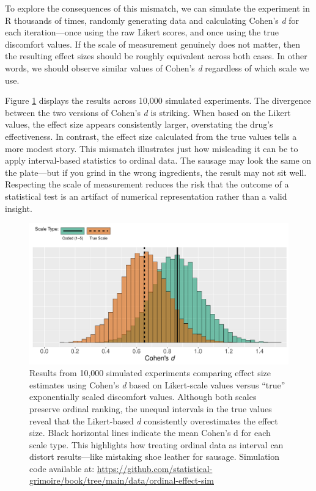 To explore the consequences of this mismatch, we can simulate the experiment in R thousands of times, randomly generating data and calculating Cohen’s \textit{d} for each iteration—once using the raw Likert scores, and once using the true discomfort values. If the scale of measurement genuinely does not matter, then the resulting effect sizes should be roughly equivalent across both cases. In other words, we should observe similar values of Cohen’s \textit{d} regardless of which scale we use.

Figure \ref{fig:ord_vs_int_effect} displays the results across 10,000 simulated experiments. The divergence between the two versions of Cohen’s \textit{d} is striking. When based on the Likert values, the effect size appears consistently larger, overstating the drug’s effectiveness. In contrast, the effect size calculated from the true values tells a more modest story. This mismatch illustrates just how misleading it can be to apply interval-based statistics to ordinal data. The sausage may look the same on the plate—but if you grind in the wrong ingredients, the result may not sit well. Respecting the scale of measurement reduces the risk that the outcome of a statistical test is an artifact of numerical representation rather than a valid insight.

\vspace{2em}

\begin{figure}[h]
\includegraphics[width = \textwidth]{data/ordinal-effect-sim/ord_vs_int_effect.pdf}
\caption{Results from 10,000 simulated experiments comparing effect size estimates using Cohen’s \textit{d} based on Likert-scale values versus ``true'' exponentially scaled discomfort values. Although both scales preserve ordinal ranking, the unequal intervals in the true values reveal that the Likert-based \textit{d} consistently overestimates the effect size. Black horizontal lines indicate the mean Cohen’s d for each scale type. This highlights how treating ordinal data as interval can distort results—like mistaking shoe leather for sausage.
Simulation code available at: \url{https://github.com/statistical-grimoire/book/tree/main/data/ordinal-effect-sim}}
\label{fig:ord_vs_int_effect}
\end{figure}

